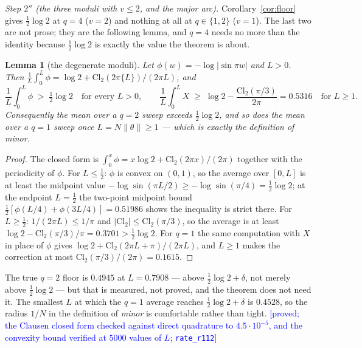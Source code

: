 \documentclass[11pt,a4paper]{article}
\theoremstyle{plain}
\newtheorem{lemma}[theorem]{Lemma}
\theoremstyle{definition}
\theoremstyle{remark}
\newcommand{\STATUS}[1]{\textcolor{blue}{\textsf{[#1]}}}
\begin{document}
\emph{Step $2''$ (the three moduli with $v\le2$, and the major arc).} Corollary~\ref{cor:floor}
gives $\tfrac12\log2$ at $q=4$ ($v=2$) and nothing at all at $q\in\{1,2\}$ ($v=1$). The last two
are not prose; they are the following lemma, and $q=4$ needs no more than the identity because
$\tfrac12\log2$ is exactly the value the theorem is about.

\begin{lemma}[the degenerate moduli]\label{lem:vone}
Let $\phi(w)=-\log|\sin\pi w|$ and $L>0$. Then
$\frac1L\int_0^L\phi=\log2+\mathrm{Cl}_2(2\pi\{L\})/(2\pi L)$, and
\[
   \frac1L\int_0^L\phi\;>\;\tfrac12\log2\quad\text{for every }L>0,
   \qquad
   \frac1L\int_0^L X\;\ge\;\log2-\frac{\mathrm{Cl}_2(\pi/3)}{2\pi}=0.5316\quad\text{for }L\ge1.
\]
Consequently the mean over a $q=2$ sweep exceeds $\tfrac12\log2$, and so does the mean over a
$q=1$ sweep once $L=N\|\theta\|\ge1$ --- which is exactly the definition of \emph{minor}.
\end{lemma}

\begin{proof}
The closed form is $\int_0^x\phi=x\log2+\mathrm{Cl}_2(2\pi x)/(2\pi)$ together with the
periodicity of $\phi$. For $L\le\tfrac12$: $\phi$ is convex on $(0,1)$, so the average over
$[0,L]$ is at least the midpoint value $-\log\sin(\pi L/2)\ge-\log\sin(\pi/4)=\tfrac12\log2$; at
the endpoint $L=\tfrac12$ the two-point midpoint bound $\tfrac12[\phi(L/4)+\phi(3L/4)]=0.51986$
shows the inequality is strict there. For $L\ge\tfrac12$: $1/(2\pi L)\le1/\pi$ and
$|\mathrm{Cl}_2|\le\mathrm{Cl}_2(\pi/3)$, so the average is at least
$\log2-\mathrm{Cl}_2(\pi/3)/\pi=0.3701>\tfrac12\log2$. For $q=1$ the same computation with $X$
in place of $\phi$ gives $\log2+\mathrm{Cl}_2(2\pi L+\pi)/(2\pi L)$, and $L\ge1$ makes the
correction at most $\mathrm{Cl}_2(\pi/3)/(2\pi)=0.1615$.
\end{proof}

\noindent
The true $q=2$ floor is $0.4945$ at $L=0.7908$ --- above $\tfrac12\log2+\delta$, not merely above
$\tfrac12\log2$ --- but that is measured, not proved, and the theorem does not need it. The
smallest $L$ at which the $q=1$ average reaches $\tfrac12\log2+\delta$ is $0.4528$, so the radius
$1/N$ in the definition of \emph{minor} is comfortable rather than tight.
\STATUS{proved; the Clausen closed form checked against direct quadrature to $4.5\cdot10^{-5}$,
and the convexity bound verified at $5000$ values of $L$; \texttt{rate\_r112}}
\end{document}
